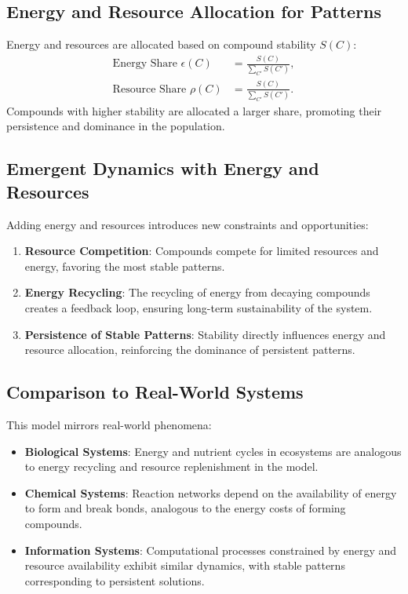 \documentclass[entropy,article,submit,pdftex,moreauthors]{Definitions/mdpi}
\begin{document}
\subsection{Energy and Resource Allocation for Patterns}

Energy and resources are allocated based on compound stability \( S(C) \):
\begin{align}
\text{Energy Share } \epsilon(C) &= \frac{S(C)}{\sum_{C'} S(C')}, \\
\text{Resource Share } \rho(C) &= \frac{S(C)}{\sum_{C'} S(C')}.
\end{align}
Compounds with higher stability are allocated a larger share, promoting their persistence and dominance in the population.

\subsection{Emergent Dynamics with Energy and Resources}

Adding energy and resources introduces new constraints and opportunities:
\begin{enumerate}
    \item \textbf{Resource Competition}: Compounds compete for limited resources and energy, favoring the most stable patterns.
    \item \textbf{Energy Recycling}: The recycling of energy from decaying compounds creates a feedback loop, ensuring long-term sustainability of the system.
    \item \textbf{Persistence of Stable Patterns}: Stability directly influences energy and resource allocation, reinforcing the dominance of persistent patterns.
\end{enumerate}

\subsection{Comparison to Real-World Systems}

This model mirrors real-world phenomena:
\begin{itemize}
    \item \textbf{Biological Systems}: Energy and nutrient cycles in ecosystems are analogous to energy recycling and resource replenishment in the model.
    \item \textbf{Chemical Systems}: Reaction networks depend on the availability of energy to form and break bonds, analogous to the energy costs of forming compounds.
    \item \textbf{Information Systems}: Computational processes constrained by energy and resource availability exhibit similar dynamics, with stable patterns corresponding to persistent solutions.
\end{itemize}
\end{document}
